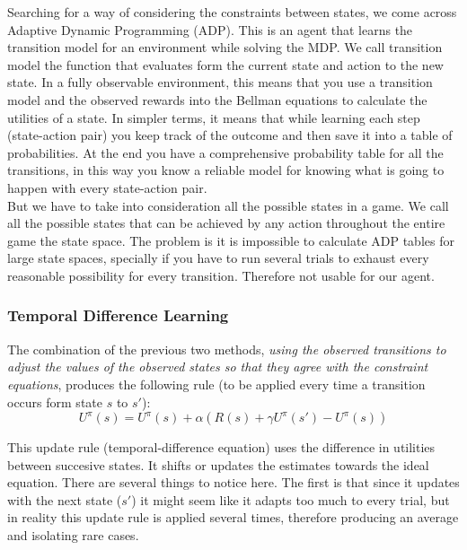 Searching for a way of considering the constraints between states, we come across Adaptive Dynamic Programming (ADP). This is an agent that learns the transition model for an environment while solving the MDP. We call transition model the function that evaluates form the current state and action to the new state. In a fully observable environment, this means that you use a transition model and the observed rewards into the Bellman equations to calculate the utilities of a state. In simpler terms, it means that while learning each step (state-action pair) you keep track of the outcome and then save it into a table of probabilities. At the end you have a comprehensive probability table for all the transitions, in this way you know a reliable model for knowing what is going to happen with every state-action pair\cite{rl}.\\


But we have to take into consideration all the possible states in a game. We call all the possible states that can be achieved by any action throughout the entire game the state space. The problem is it is impossible to calculate ADP tables for large state spaces, specially if you have to run several trials to exhaust every reasonable possibility for every transition. Therefore not usable for our agent. \\


\subsubsection{Temporal Difference Learning} \label{TDE}

The combination of the previous two methods, \textit{using the observed transitions to adjust the values of the observed states so that they agree with the constraint equations}\cite[p767]{rl}, produces the following rule (to be applied every time a transition occurs form state $s$ to $s'$):\\

\begin{equation}
U^\pi(s) = U^\pi(s) + \alpha(R(s)+\gamma U^\pi(s') -  U^\pi(s))
\end{equation}

This update rule (temporal-difference equation) uses the difference in utilities between succesive states. It shifts or updates the estimates towards the ideal equation. There are several things to notice here. The first is that since it updates with the next state ($s'$) it might seem like it adapts too much to every trial, but in reality this update rule is applied several times, therefore producing an average and isolating rare cases. \cite{rl} \\

